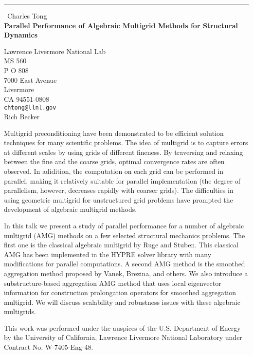 \documentclass{report}
\begin{document}
\begin{center}
\rule{6in}{1pt} \
{\large Charles Tong \\
{\bf Parallel Performance of Algebraic Multigrid Methods for Structural Dynamics }}

Lawrence Livermore National Lab \\ MS 560 \\ P O 808 \\ 7000 East Avenue \\ Livermore \\ CA 94551-0808
\\
{\tt chtong@llnl.gov}\\
Rich Becker\end{center}

Multigrid preconditioning have been demonstrated to be efficient solution
techniques for many scientific problems. The idea of multigrid is to
capture errors at different scales by using grids of different fineness.
By traversing and relaxing between the fine and the coarse grids, optimal
convergence rates are often observed. In adidition, the computation on
each grid can be performed in parallel, making it relatively suitable for
parallel implementation (the degree of parallelism, however, decreases
rapidly with coarser grids). The difficulties in using geometric multigrid
for unstructured grid problems have prompted the development of algebraic
multigrid methods.

In this talk we present a study of parallel performance for a number of
algebraic multigrid (AMG) methods on a few selected structural mechanics
problems. The first one is the classical algebraic multigrid by Ruge and
Stuben. This classical AMG has been implemented in the HYPRE solver
library with many modifications for parallel computations. A second AMG
method is the smoothed aggregation method proposed by Vanek, Brezina, and
others. We also introduce a substructure-based aggregation AMG method that
uses local eigenvector information for construction prolongation operators
for smoothed aggregation multigrid. We will discuss scalability and robustness
issues with these algebraic multigrids.



This work was performed under the auspices of the U.S. Department of
Energy by the University of California, Lawrence Livermore National
Laboratory under Contract No. W-7405-Eng-48.
\end{document}
